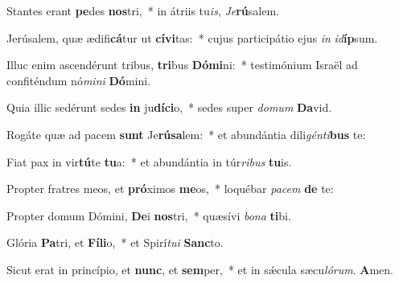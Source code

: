 \vs Stantes erant \textbf{pe}des \textbf{nos}tri,~* in átriis tu\textit{is}, \textit{Je}\textbf{rú}salem.

\vs Jerúsalem, quæ ædifi\textbf{cá}tur ut \textbf{cí}\-\textbf{vi}\-tas:~* cujus participátio ejus \textit{in} \textit{id}\textbf{íp}sum.

\vs Illuc enim ascendérunt tribus, \textbf{tri}bus \textbf{Dó}\textbf{mi}ni:~* testimónium Israël ad confiténdum nó\textit{mi}\textit{ni} \textbf{Dó}mini.

\vs Quia illic sedérunt sedes \textbf{in} ju\-\textbf{dí}\-\textbf{ci}o,~* sedes super \textit{do}\textit{mum} \textbf{Da}vid.

\vs Rogáte quæ ad pacem \textbf{sunt} Je\-\textbf{rú}\-\textbf{sa}\-lem:~* et abundántia dili\textit{gén}\textit{ti}\textbf{bus} te:

\vs Fiat pax in vir\textbf{tú}te \textbf{tu}a:~* et abundántia in túr\textit{ri}\textit{bus} \textbf{tu}is.

\vs Propter fratres meos, et \textbf{pró}ximos \textbf{me}os,~* loquébar \textit{pa}\textit{cem} \textbf{de} te:

\vs Propter domum Dómini, \textbf{De}i \textbf{nos}tri,~* quæsívi \textit{bo}\textit{na} \textbf{ti}bi.

\vs Glória \textbf{Pa}tri, et \textbf{Fí}\textbf{li}o,~* et Spirí\textit{tu}\textit{i} \textbf{Sanc}to.

\vs Sicut erat in princípio, et \textbf{nunc}, et \textbf{sem}per,~* et in sǽcula sæcu\textit{ló}\textit{rum}. \textbf{A}men.

